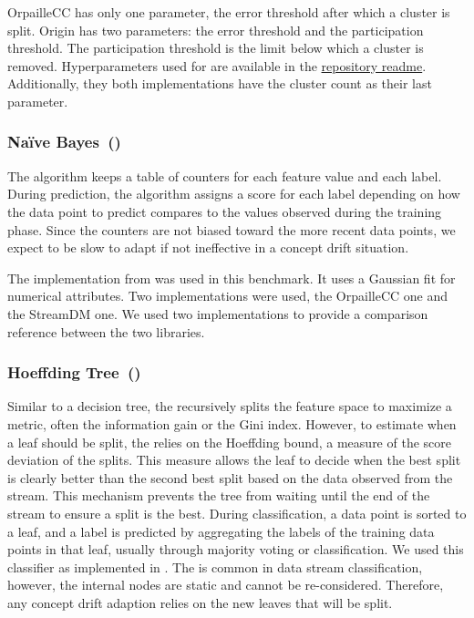\mcnn OrpailleCC has only one parameter, the error threshold after which a
cluster is split.  \mcnn Origin has two parameters: the error threshold and the
participation threshold. The participation threshold is the limit below which a
cluster is removed.  Hyperparameters used for \mcnn are available in the
\href{https://github.com/azazel7/paper-benchmark/blob/master/README.md}{repository
readme}. Additionally, they both implementations have the cluster count as their
last parameter.

\subsubsection{Naïve Bayes~(\naivebayes)~\cite{naive_bayes}}
The \naivebayes algorithm keeps a table of counters for each feature value and
each label. During prediction, the algorithm assigns a score for each label
depending on how the data point to predict compares to the values observed
during the training phase. Since the counters are not biased toward the more
recent data points, we expect \naivebayes to be slow to adapt if not ineffective
in a concept drift situation.

The implementation from \streamdmcpp was used in this benchmark. It uses a
Gaussian fit for numerical attributes. Two implementations were used, the
OrpailleCC one and the StreamDM one. We used two implementations to provide a
comparison reference between the two libraries.

\subsubsection{Hoeffding Tree~(\hoeffdingtree)~\cite{VFDT}}
Similar to a decision tree, the \hoeffdingtree recursively splits the feature
space to maximize a metric, often the information gain or the Gini index.
However,  to estimate when a leaf should be split, the \hoeffdingtree relies on
the Hoeffding bound, a measure of the score deviation of the splits.  This
measure allows the leaf to decide when the best split is clearly better than the
second best split based on the data observed from the stream. This mechanism
prevents the tree from waiting until the end of the stream to ensure a split is
the best. During classification, a data point is sorted to a leaf, and a label
is predicted by aggregating the labels of the training data points in that leaf,
usually through majority voting or \naivebayes classification.  We used this
classifier as implemented in \streamdmcpp.  The \hoeffdingtree is common in data
stream classification, however, the internal nodes are static and cannot be
re-considered. Therefore, any concept drift adaption relies on the new leaves
that will be split.

